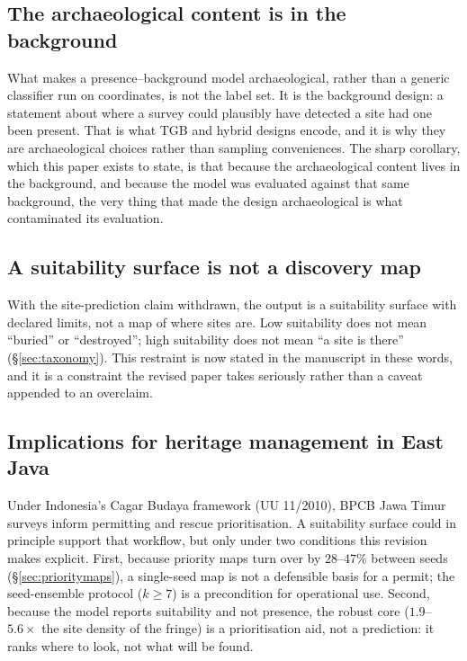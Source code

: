 \documentclass[12pt]{article}
\begin{document}
\subsection{The archaeological content is in the background}

What makes a presence--background model archaeological, rather than a generic classifier run on coordinates, is not the label set.
It is the background design: a statement about where a survey could plausibly have detected a site had one been present.
That is what TGB and hybrid designs encode, and it is why they are archaeological choices rather than sampling conveniences.
The sharp corollary, which this paper exists to state, is that because the archaeological content lives in the background, and because the model was evaluated against that same background, the very thing that made the design archaeological is what contaminated its evaluation.

\subsection{A suitability surface is not a discovery map}

With the site-prediction claim withdrawn, the output is a suitability surface with declared limits, not a map of where sites are.
Low suitability does not mean ``buried'' or ``destroyed''; high suitability does not mean ``a site is there'' (\S\ref{sec:taxonomy}).
This restraint is now stated in the manuscript in these words, and it is a constraint the revised paper takes seriously rather than a caveat appended to an overclaim.

\subsection{Implications for heritage management in East Java}

Under Indonesia's Cagar Budaya framework (UU 11/2010), BPCB Jawa Timur surveys inform permitting and rescue prioritisation.
A suitability surface could in principle support that workflow, but only under two conditions this revision makes explicit.
First, because priority maps turn over by $28$--$47\%$ between seeds (\S\ref{sec:prioritymaps}), a single-seed map is not a defensible basis for a permit; the seed-ensemble protocol ($k \geq 7$) is a precondition for operational use.
Second, because the model reports suitability and not presence, the robust core ($1.9$--$5.6\times$ the site density of the fringe) is a prioritisation aid, not a prediction: it ranks where to look, not what will be found.
\end{document}
